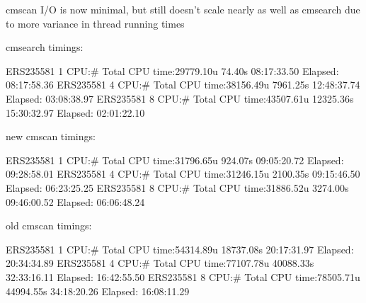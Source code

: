 \documentclass[landscape]{slides}
\begin{document}
\begin{slide}
\begin{center}
cmscan I/O is now minimal, but still doesn't scale nearly as well as cmsearch
due to more variance in thread running times
\medskip

\begin{sreoutput}
cmsearch timings:

ERS235581 1 CPU:# Total CPU time:29779.10u    74.40s 08:17:33.50 Elapsed: 08:17:58.36
ERS235581 4 CPU:# Total CPU time:38156.49u  7961.25s 12:48:37.74 Elapsed: 03:08:38.97
ERS235581 8 CPU:# Total CPU time:43507.61u 12325.36s 15:30:32.97 Elapsed: 02:01:22.10




new cmscan timings:

ERS235581 1 CPU:# Total CPU time:31796.65u  924.07s 09:05:20.72 Elapsed: 09:28:58.01
ERS235581 4 CPU:# Total CPU time:31246.15u 2100.35s 09:15:46.50 Elapsed: 06:23:25.25
ERS235581 8 CPU:# Total CPU time:31886.52u 3274.00s 09:46:00.52 Elapsed: 06:06:48.24

old cmscan timings:

ERS235581 1 CPU:# Total CPU time:54314.89u 18737.08s 20:17:31.97 Elapsed: 20:34:34.89
ERS235581 4 CPU:# Total CPU time:77107.78u 40088.33s 32:33:16.11 Elapsed: 16:42:55.50
ERS235581 8 CPU:# Total CPU time:78505.71u 44994.55s 34:18:20.26 Elapsed: 16:08:11.29

\end{sreoutput}

\vfill
\end{center}
\end{slide}

\end{document}
